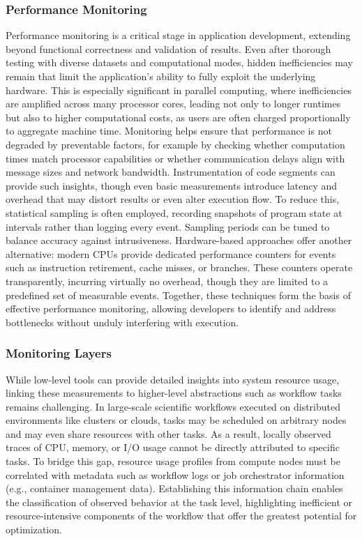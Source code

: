 \subsubsection{Performance Monitoring}
\label{sec:background_monitoring_performance}
Performance monitoring is a critical stage in application development, extending beyond functional correctness and validation of results. Even after thorough testing with diverse datasets and computational modes, hidden inefficiencies may remain that limit the application’s ability to fully exploit the underlying hardware. This is especially significant in parallel computing, where inefficiencies are amplified across many processor cores, leading not only to longer runtimes but also to higher computational costs, as users are often charged proportionally to aggregate machine time. Monitoring helps ensure that performance is not degraded by preventable factors, for example by checking whether computation times match processor capabilities or whether communication delays align with message sizes and network bandwidth. Instrumentation of code segments can provide such insights, though even basic measurements introduce latency and overhead that may distort results or even alter execution flow. To reduce this, statistical sampling is often employed, recording snapshots of program state at intervals rather than logging every event. Sampling periods can be tuned to balance accuracy against intrusiveness. Hardware-based approaches offer another alternative: modern CPUs provide dedicated performance counters for events such as instruction retirement, cache misses, or branches. These counters operate transparently, incurring virtually no overhead, though they are limited to a predefined set of measurable events. Together, these techniques form the basis of effective performance monitoring, allowing developers to identify and address bottlenecks without unduly interfering with execution.

\subsubsection{Monitoring Layers}
\label{sec:background_monitoring_layers}
While low-level tools can provide detailed insights into system resource usage, linking these measurements to higher-level abstractions such as workflow tasks remains challenging. In large-scale scientific workflows executed on distributed environments like clusters or clouds, tasks may be scheduled on arbitrary nodes and may even share resources with other tasks. As a result, locally observed traces of CPU, memory, or I/O usage cannot be directly attributed to specific tasks. To bridge this gap, resource usage profiles from compute nodes must be correlated with metadata such as workflow logs or job orchestrator information (e.g., container management data). Establishing this information chain enables the classification of observed behavior at the task level, highlighting inefficient or resource-intensive components of the workflow that offer the greatest potential for optimization.

